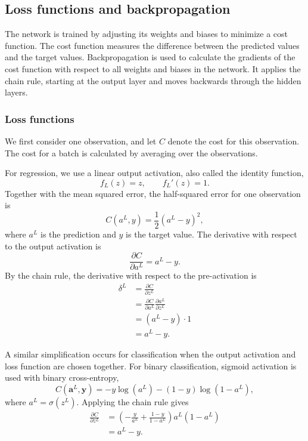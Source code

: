 \documentclass[amssymb,secnumarabic,twocolumn,aps]{revtex4}
\begin{document}
\subsection{Loss functions and backpropagation}

The network is trained by adjusting its weights and biases to minimize a cost function. The cost function measures the difference between the predicted values and the target values. Backpropagation is used to calculate the gradients of the cost function with respect to all weights and biases in the network. It applies the chain rule, starting at the output layer and moves backwards through the hidden layers.
\subsubsection{Loss functions}

We first consider one observation, and let $C$ denote the cost for this observation. The cost for a batch is calculated by averaging over the observations.

For regression, we use a linear output activation, also called the identity function,
\begin{equation*}
    f_L(z)=z,
    \qquad
    f_L'(z)=1.
\end{equation*}
Together with the mean squared error, the half-squared error for one observation is
\begin{equation*}
    C(a^L,y) = \frac{1}{2}(a^L-y)^2,
\end{equation*}
where $a^L$ is the prediction and $y$ is the target value.
The derivative with respect to the output activation is
\begin{equation*}
    \frac{\partial C}{\partial a^L} = a^L-y.
\end{equation*}
By the chain rule, the derivative with respect to the
pre-activation is
\begin{align*}
    \delta^L
     & = \frac{\partial C}{\partial z^L} \\
     & = \frac{\partial C}{\partial a^L}
    \frac{\partial a^L}{\partial z^L}    \\
     & = (a^L-y)\cdot 1                  \\
     & = a^L-y.
\end{align*}

A similar simplification occurs for classification when the output activation and loss function are chosen together. For binary classification, sigmoid activation is used with binary cross-entropy,
\begin{equation*}
    C(\boldsymbol{a}^L,\boldsymbol{y})=-y\log(a^L)-(1-y)\log(1-a^L),
\end{equation*}
where $a^L=\sigma(z^L)$. Applying the chain rule gives
\begin{align*}
    \frac{\partial C}{\partial z^L}
     & =
    \left(
    -\frac{y}{a^L}
    +\frac{1-y}{1-a^L}
    \right)a^L(1-a^L) \\
     & =a^L-y.
\end{align*}
\end{document}
